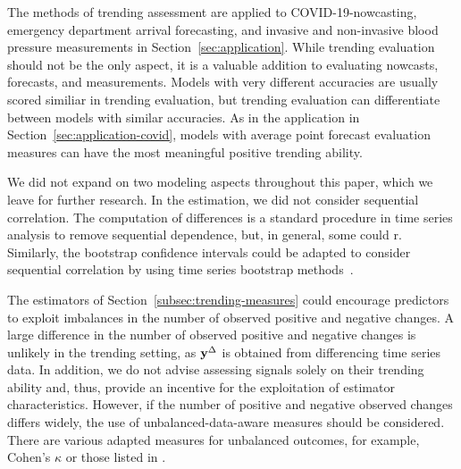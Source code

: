 The methods of trending assessment are applied to COVID-19-nowcasting, emergency department arrival forecasting, and invasive and non-invasive blood pressure measurements in Section~\ref{sec:application}.
While trending evaluation should not be the only aspect, it is a valuable addition to evaluating nowcasts, forecasts, and measurements.
Models with very different accuracies are usually scored similiar in trending evaluation, but trending evaluation can differentiate between models with similar accuracies.
As in the application in Section~\ref{sec:application-covid}, models with average point forecast evaluation measures can have the most meaningful positive trending ability.

We did not expand on two modeling aspects throughout this paper, which we leave for further research.
In the estimation, we did not consider sequential correlation.
The computation of differences is a standard procedure in time series analysis to remove sequential dependence, but, in general, some could r.
Similarly, the bootstrap confidence intervals could be adapted to consider sequential correlation by using time series bootstrap methods~\parencite{Hardle2003,Kreiss2012}.

The estimators of Section~\ref{subsec:trending-measures} could encourage predictors to exploit imbalances in the number of observed positive and negative changes.
A large difference in the number of observed positive and negative changes is unlikely in the trending setting, as $\mathbf{y}^{\Delta}$ is obtained from differencing time series data.
In addition, we do not advise assessing signals solely on their trending ability and, thus, provide an incentive for the exploitation of estimator characteristics.
However, if the number of positive and negative observed changes differs widely, the use of unbalanced-data-aware measures should be considered.
There are various adapted measures for unbalanced outcomes, for example, Cohen's $\kappa$ \parencite{Cohen1960} or those listed in \textcite[Table 3.3]{Jolliffe2012}.
